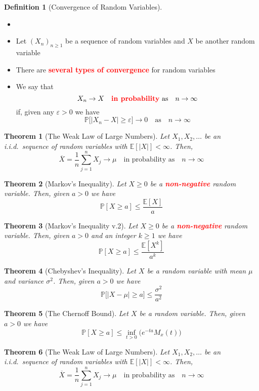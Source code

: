 \documentclass{article}
\newcommand{\PP}{\mathbb{P}}
\newcommand{\E}{\mathbb{E}}
\newcommand{\bfred}[1]{\textcolor{red}{\textbf{#1}}}
\theoremstyle{plain}
\newtheorem{thm}{Theorem}[section]
\theoremstyle{definition}
\newtheorem{defn}{Definition}[section]
\theoremstyle{remark}
\begin{document}
\begin{defn}[Convergence of Random Variables]
    \begin{itemize}
        \item []
        \item Let $(X_n)_{n\geq1}$ be a sequence of random variables and $X$ be another random variable
        \item There are \bfred{several types of convergence} for random variables
        \item We say that \[X_n\rightarrow X \quad \text{\bfred{in probability} as} \quad n\rightarrow\infty\] if, given any $\varepsilon>0$ we have \[\PP\bigr[|X_n-X|\geq\varepsilon\bigr]\rightarrow 0 \quad \text{as} \quad n\rightarrow\infty\]
    \end{itemize}
\end{defn}

\begin{thm}[The Weak Law of Large Numbers]
    Let $X_1,X_2,\dotsc$ be an i.i.d.\ sequence of random variables with $\E[|X|]<\infty$. Then, \[\overline{X}=\frac{1}{n}\sum_{j=1}^nX_j\rightarrow\mu\quad \text{in probability as} \quad n\rightarrow\infty\]
\end{thm}

\begin{thm}[Markov's Inequality]
    Let $X\geq0$ be a \bfred{non-negative} random variable. Then, given $a>0$ we have \[\PP[X\geq a]\leq\frac{\E[X]}{a}\]
\end{thm}

\begin{thm}[Markov's Inequality v.2]
    Let $X\geq0$ be a \bfred{non-negative} random variable. Then, given $a>0$ and an integer $k\geq 1$ we have \[\PP[X\geq a]\leq\frac{\E[X^k]}{a^k}\]
\end{thm}

\begin{thm}[Chebyshev's Inequality]
    Let $X$ be a random variable with mean $\mu$ and variance $\sigma^2$. Then, given $a>0$ we have \[\PP\bigr[|X-\mu|\geq a\bigr]\leq\frac{\sigma^2}{a^2}\]
\end{thm}

\begin{thm}[The Chernoff Bound]
    Let $X$ be a random variable. Then, given $a>0$ we have \[\PP[X\geq a]\leq\inf_{t>0}\bigr(e^{-ta}M_x(t)\bigr)\]
\end{thm}

\begin{thm}[The Weak Law of Large Numbers]
    Let $X_1,X_2,\dotsc$ be an i.i.d.\ sequence of random variables with $\E[|X|]<\infty$. Then, \[\overline{X}=\frac{1}{n}\sum_{j=1}^nX_j\rightarrow\mu\quad\text{in probability as}\quad n\rightarrow\infty\]
\end{thm}
\end{document}
